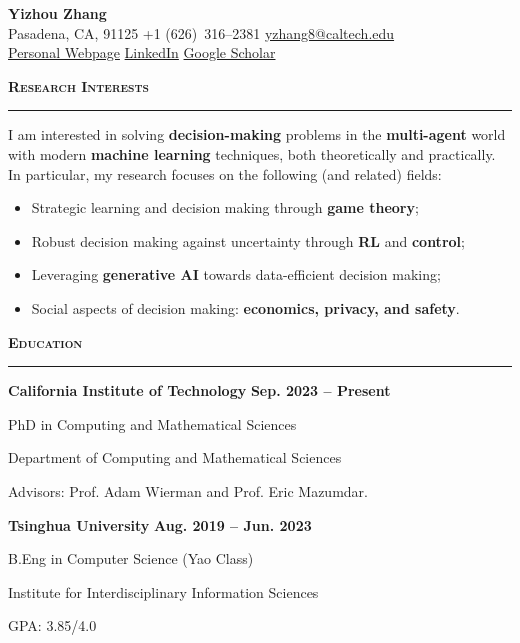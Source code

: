 \documentclass[11pt]{article}
\newcommand{\CVName}[1]{{\Huge\bfseries #1}}
\newcommand{\CVLine}[1]{{\small #1}}
\newcommand{\Section}[1]{%
  \vspace{0.9\baselineskip}%
  {\large\bfseries\scshape #1}\\[-0.35\baselineskip]
  \rule{\linewidth}{0.4pt}\vspace{0.35\baselineskip}%
}
\begin{document}
\begin{center}
  \CVName{Yizhou Zhang}\\[0.25\baselineskip]
  \CVLine{Pasadena, CA, 91125 \;\textbullet\; +1 (626)~316--2381}\;\textbullet\; \href{mailto:yzhang8@caltech.edu}{yzhang8@caltech.edu} \\
  \CVLine{\href{https://zhangyizhou19.com}{Personal Webpage} \;\textbullet\; \href{https://www.linkedin.com/in/yizhou-zhang-749a78230/$0}{LinkedIn}\;\textbullet\; \href{https://scholar.google.com/citations?user=ARr_mnwAAAAJ&hl=en}{Google Scholar} }
\end{center}

\Section{Research Interests}
I am interested in solving \textbf{decision-making} problems in the \textbf{multi-agent} world with modern \textbf{machine learning} techniques, both theoretically and practically. In particular, my research focuses on the following (and related) fields:

\begin{itemize}
  \item[$\diamond$] Strategic learning and decision making through \textbf{game theory};
  \item[$\diamond$] Robust decision making against uncertainty through \textbf{RL} and \textbf{control};
  \item[$\diamond$] Leveraging \textbf{generative AI} towards data-efficient decision making;
  \item[$\diamond$] Social aspects of decision making: \textbf{economics, privacy, and safety}.
\end{itemize}

\Section{Education}

{\bf California Institute of Technology} {\hfill \bf Sep. 2023 -- Present}
\begin{list2}
\item[] PhD in Computing and Mathematical Sciences
\item[] Department of Computing and Mathematical Sciences
\item[] Advisors: Prof. Adam Wierman and Prof. Eric Mazumdar.
\end{list2}

{\bf Tsinghua University} {\hfill \bf Aug. 2019 -- Jun. 2023}
\begin{list2}
\item[] B.Eng in Computer Science (Yao Class) 
\item[] Institute for Interdisciplinary Information Sciences
\item[] GPA: 3.85/4.0
\end{list2}
\end{document}
